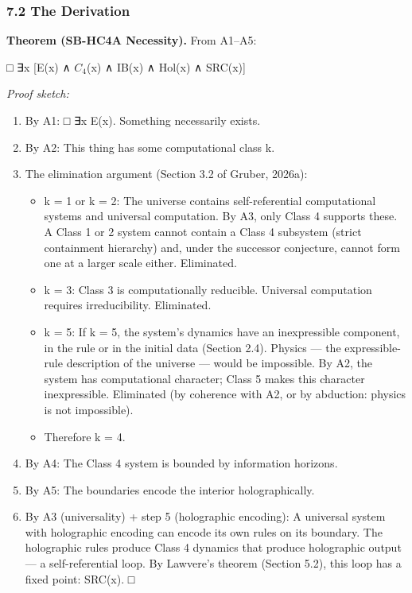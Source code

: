 \documentclass[
]{article}
\providecommand{\tightlist}{%
  \setlength{\itemsep}{0pt}\setlength{\parskip}{0pt}}
\begin{document}
\hypertarget{the-derivation}{%
\subsubsection{7.2 The Derivation}\label{the-derivation}}

\textbf{Theorem (SB-HC4A Necessity).} From A1--A5:

□ ∃x {[}E(x) ∧ \(C_{4}\)(x) ∧ IB(x) ∧ Hol(x) ∧ SRC(x){]}

\emph{Proof sketch:}

\begin{enumerate}
\def\labelenumi{\arabic{enumi}.}
\tightlist
\item
  By A1: □ ∃x E(x). Something necessarily exists.
\item
  By A2: This thing has some computational class k.
\item
  The elimination argument (Section 3.2 of Gruber, 2026a):

  \begin{itemize}
  \tightlist
  \item
    k = 1 or k = 2: The universe contains self-referential computational
    systems and universal computation. By A3, only Class 4 supports
    these. A Class 1 or 2 system cannot contain a Class 4 subsystem
    (strict containment hierarchy) and, under the successor conjecture,
    cannot form one at a larger scale either. Eliminated.
  \item
    k = 3: Class 3 is computationally reducible. Universal computation
    requires irreducibility. Eliminated.
  \item
    k = 5: If k = 5, the system's dynamics have an inexpressible
    component, in the rule or in the initial data (Section 2.4). Physics
    --- the expressible-rule description of the universe --- would be
    impossible. By A2, the system has computational character; Class 5
    makes this character inexpressible. Eliminated (by coherence with
    A2, or by abduction: physics is not impossible).
  \item
    Therefore k = 4.
  \end{itemize}
\item
  By A4: The Class 4 system is bounded by information horizons.
\item
  By A5: The boundaries encode the interior holographically.
\item
  By A3 (universality) + step 5 (holographic encoding): A universal
  system with holographic encoding can encode its own rules on its
  boundary. The holographic rules produce Class 4 dynamics that produce
  holographic output --- a self-referential loop. By Lawvere's theorem
  (Section 5.2), this loop has a fixed point: SRC(x). □
\end{enumerate}
\end{document}
